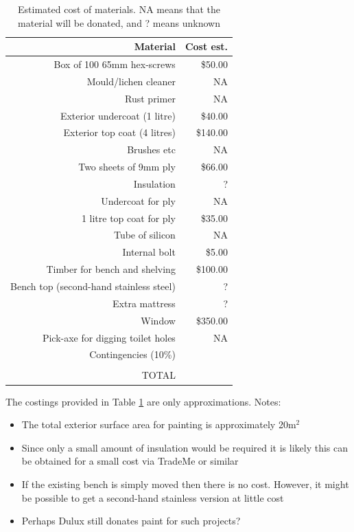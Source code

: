 \documentclass[12pt]{article} %
\begin{document}
\begin{table}[ht]
\caption{Estimated cost of materials.  NA means that the material will be donated, and ? means unknown} %
\label{costs}
\centering %
\begin{tabular}{rr}
\hline
Material & Cost est. \\ [0.5ex]
\hline %
Box of 100 65mm hex-screws & \$50.00\\
Mould/lichen cleaner & NA\\
Rust primer & NA\\
Exterior undercoat (1 litre) & \$40.00\\
Exterior top coat (4 litres) & \$140.00\\
Brushes etc & NA\\
Two sheets of 9mm ply & \$66.00 \\
Insulation & ?\\
Undercoat for ply & NA \\
1 litre top coat for ply & \$35.00 \\
Tube of silicon & NA \\
Internal bolt & \$5.00 \\
Timber for bench and shelving & \$100.00 \\
Bench top (second-hand stainless steel) & ?\\
Extra mattress & ?\\
Window & \$350.00 \\
Pick-axe for digging toilet holes & NA \\
Contingencies (10\%) & \\ [1ex] %
\hline \\
TOTAL & \\
\hline \hline %
\end{tabular}
\label{costs} %
\end{table}

The costings provided in Table \ref{costs} are only approximations.  Notes:

\begin{itemize}
 \item The total exterior surface area for painting is approximately 20m$^2$
 \item Since only a small amount of insulation would be required it is likely this can be obtained for a small cost via TradeMe or similar
 \item If the existing bench is simply moved then there is no cost.  However, it might be possible to get a second-hand stainless version at little cost
 \item Perhaps Dulux still donates paint for such projects?
\end{itemize}
\end{document}
